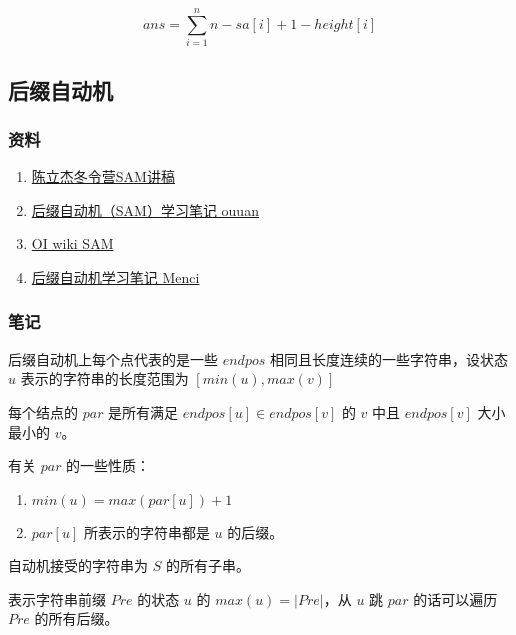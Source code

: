 \documentclass[
]{article}
\providecommand{\tightlist}{%
  \setlength{\itemsep}{0pt}\setlength{\parskip}{0pt}}
\begin{document}
\[ans=\sum_{i=1}^{n}n-sa[i]+1-height[i]\]

\hypertarget{ux540eux7f00ux81eaux52a8ux673a}{%
\subsection{后缀自动机}\label{ux540eux7f00ux81eaux52a8ux673a}}

\hypertarget{ux8d44ux6599-5}{%
\subsubsection{资料}\label{ux8d44ux6599-5}}

\begin{enumerate}
\def\labelenumi{\arabic{enumi}.}
\tightlist
\item
  \href{https://wenku.baidu.com/view/fa02d3fff111f18582d05a81?ivk_sa=1023194j}{陈立杰冬令营SAM讲稿}
\item
  \href{https://ouuan.github.io/\%E5\%90\%8E\%E7\%BC\%80\%E8\%87\%AA\%E5\%8A\%A8\%E6\%9C\%BA\%EF\%BC\%88SAM\%EF\%BC\%89\%E5\%AD\%A6\%E4\%B9\%A0\%E7\%AC\%94\%E8\%AE\%B0/}{后缀自动机（SAM）学习笔记
  ouuan}
\item
  \href{https://oi-wiki.org/string/sam/}{OI wiki SAM}
\item
  \href{https://oi.men.ci/suffix-automaton-notes/}{后缀自动机学习笔记
  Menci}
\end{enumerate}

\hypertarget{ux7b14ux8bb0}{%
\subsubsection{笔记}\label{ux7b14ux8bb0}}

后缀自动机上每个点代表的是一些 \(endpos\)
相同且长度连续的一些字符串，设状态 \(u\) 表示的字符串的长度范围为
\([min(u),max(v)]\)

每个结点的 \(par\) 是所有满足 \(endpos[u] \in endpos[v]\) 的 \(v\) 中且
\(endpos[v]\) 大小最小的 \(v\)。

有关 \(par\) 的一些性质：

\begin{enumerate}
\def\labelenumi{\arabic{enumi}.}
\item
  \(min(u)=max(par[u])+1\)
\item
  \(par[u]\) 所表示的字符串都是 \(u\) 的后缀。
\end{enumerate}

自动机接受的字符串为 \(S\) 的所有子串。

表示字符串前缀 \(Pre\) 的状态 \(u\) 的 \(max(u) = |Pre|\)，从 \(u\) 跳
\(par\) 的话可以遍历 \(Pre\) 的所有后缀。
\end{document}
